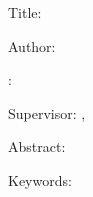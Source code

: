 

\newpage


{
\small
\setlength\parindent{0mm}
\setlength\parskip{2ex}

Title:
\ThesisTitle

Author:
\ThesisAuthor

\DeptType:
\Department

Supervisor:
\Supervisor, \SupervisorsDepartment

Abstract:
\Abstract

Keywords:
\Keywords
}

\newpage

